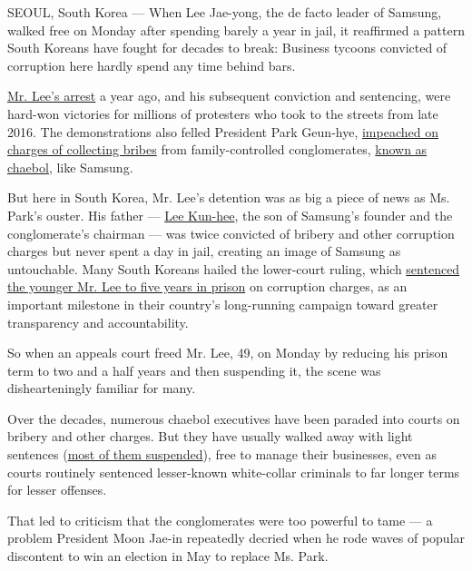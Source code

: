 SEOUL, South Korea --- When Lee Jae-yong, the de facto leader of
Samsung, walked free on Monday after spending barely a year in jail, it
reaffirmed a pattern South Koreans have fought for decades to break:
Business tycoons convicted of corruption here hardly spend any time
behind bars.

\href{https://www.nytimes.com/2017/02/16/world/asia/korea-samsung-lee-jae-yong.html}{Mr.
Lee's arrest} a year ago, and his subsequent conviction and sentencing,
were hard-won victories for millions of protesters who took to the
streets from late 2016. The demonstrations also felled President Park
Geun-hye,
\href{https://www.nytimes.com/2017/04/17/world/asia/park-geun-hye-south-korea-president-indictment.html}{impeached
on charges of collecting bribes} from family-controlled conglomerates,
\href{https://www.nytimes.com/2017/03/04/business/south-korea-samsung-bribery-lee.html}{known
as chaebol}, like Samsung.

But here in South Korea, Mr. Lee's detention was as big a piece of news
as Ms. Park's ouster. His father ---
\href{http://www.nytimes.com/2009/12/30/business/global/30samsung.html}{Lee
Kun-hee}, the son of Samsung's founder and the conglomerate's chairman
--- was twice convicted of bribery and other corruption charges but
never spent a day in jail, creating an image of Samsung as untouchable.
Many South Koreans hailed the lower-court ruling, which
\href{https://www.nytimes.com/2017/08/25/business/samsung-bribery-embezzlement-conviction-jay-lee-south-korea.html}{sentenced
the younger Mr. Lee to five years in prison} on corruption charges, as
an important milestone in their country's long-running campaign toward
greater transparency and accountability.

So when an appeals court freed Mr. Lee, 49, on Monday by reducing his
prison term to two and a half years and then suspending it, the scene
was dishearteningly familiar for many.

Over the decades, numerous chaebol executives have been paraded into
courts on bribery and other charges. But they have usually walked away
with light sentences
(\href{https://www.nytimes.com/2017/12/22/business/korea-lotte-corruption-conviction.html}{most
of them suspended}), free to manage their businesses, even as courts
routinely sentenced lesser-known white-collar criminals to far longer
terms for lesser offenses.

That led to criticism that the conglomerates were too powerful to tame
--- a problem President Moon Jae-in repeatedly decried when he rode
waves of popular discontent to win an election in May to replace Ms.
Park.

